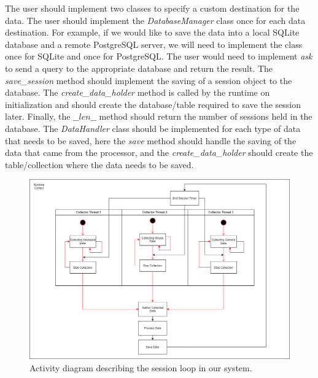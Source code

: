 \documentclass[../main.tex]{subfiles}
\begin{document}
\begin{itemize}
\begin{lstlisting}[language=Python]
        \end{lstlisting}
        The user should implement two classes to specify a custom destination for the data. The user should implement the \textit{DatabaseManager} 
        class once for each data destination. For example, if we would like to save the data into a local SQLite database and a remote PostgreSQL server, 
        we will need to implement the class once for SQLite and once for PostgreSQL. 
        The user would need to implement \textit{ask} to send a query to the appropriate database and return the result.
        The \textit{save\_session} method should implement the saving of a session object to the database.
        The \textit{create\_data\_holder} method is called by the runtime on initialization and should create the database/table required to save the session later.
        Finally, the $\_\_len\_\_$ method should return the number of sessions held in the database. 
        The \textit{DataHandler} class should be implemented for each type of data that needs to be saved, here the \textit{save} method should handle the 
        saving of the data that came from the processor, and the \textit{create\_data\_holder} should create the table/collection where the data needs to be saved.
    
    \begin{figure}[htp]
        \centering
        \includegraphics[width=14cm]{figures/sys_activity}   
        \caption{Activity diagram describing the session loop in our system.}
        \label{fig:sys_activity} 
    \end{figure}



\end{itemize}
\end{document}
